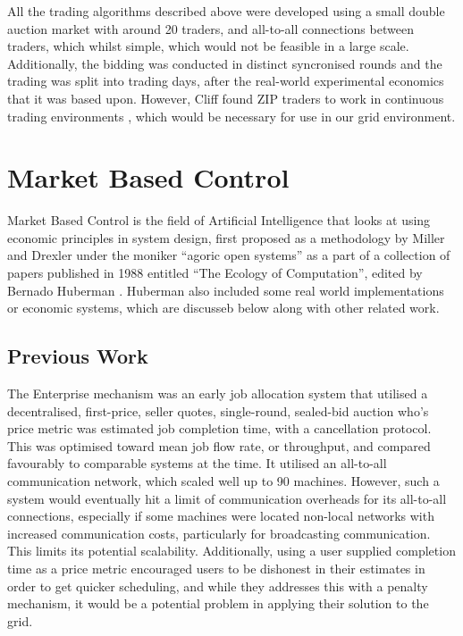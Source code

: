 All the trading algorithms described above were developed using a small double
auction market with around 20 traders, and all-to-all connections between
traders, which whilst simple, which would not be feasible in a large scale.
Additionally, the bidding was conducted in distinct syncronised rounds and the
trading was split into trading days, after the real-world experimental
economics that it was based upon. However, Cliff found ZIP traders to work in
continuous trading environments \cite{eco-cliff01-days}, which would be
necessary for use in our grid environment.


\section{Market Based Control}

Market Based Control is the field of Artificial Intelligence that looks at
using economic principles in system design, first proposed as a methodology by
Miller and Drexler under the moniker ``agoric open systems''
\cite{eco-miller88-markets} as a part of a collection of papers published in 1988
entitled ``The Ecology of Computation'', edited by Bernado Huberman
\cite{eco-huberman88-ecology}. Huberman also included some real world
implementations or economic systems, which are discusseb below along with other
related work. 

\subsection{Previous Work}

The Enterprise mechanism \cite{eco-malone88-enterprise} was an early job
allocation system that utilised a decentralised, first-price, seller quotes,
single-round, sealed-bid auction who's price metric was estimated job
completion time, with a cancellation protocol. This was optimised toward mean
job flow rate, or throughput, and compared favourably to comparable systems at
the time.  It utilised an all-to-all communication network, which scaled well
up to 90 machines. However, such a system would eventually hit a limit of
communication overheads for its all-to-all connections, especially if some
machines were located non-local networks with increased communication costs,
particularly for broadcasting communication. This limits its potential
scalability. Additionally, using a user supplied completion time as a price
metric encouraged users to be dishonest in their estimates in order to get
quicker scheduling, and while they addresses this with a penalty mechanism, it
would be a potential problem in applying their solution to the grid.

